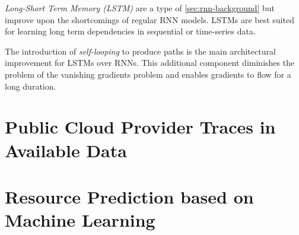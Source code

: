         \emph{Long-Short Term Memory (LSTM)} are a type of \ref{sec:rnn-background} but improve upon the shortcomings of regular RNN models.
        LSTMs are best suited for learning long term dependencies in sequential or time-series data.

        The introduction of \emph{self-looping} to produce paths is the main architectural improvement for LSTMs over RNNs. This additional component diminishes the problem of the vanishing gradients problem and enables gradients to flow for a long duration.

        





    \section{Public Cloud Provider Traces in Available Data}
    \label{sec:public-cloud-provider-traces-in-available-data-sota}

    \section{Resource Prediction based on Machine Learning}
    \label{sec:resource-prediction-based-on-machine-learning-sota}